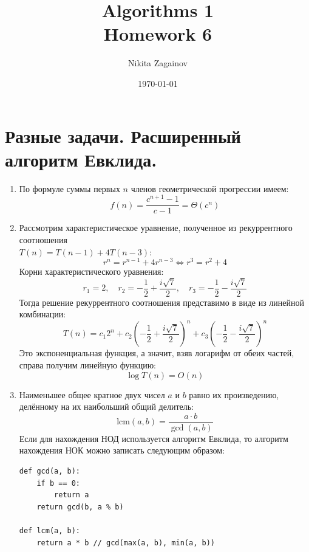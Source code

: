 \documentclass{article}
\title{Algorithms 1 \\ Homework 6}
\author{Nikita Zagainov}
\date{\today}
\begin{document}
\maketitle

\section{Разные задачи. Расширенный алгоритм Евклида.}
\begin{enumerate}
    \item
          По формуле суммы первых $n$ членов
          геометрической прогрессии имеем:
          \[
              f(n) = \frac{c^{n + 1} - 1}{c - 1} = \Theta(c^n)
          \]

    \item
          Рассмотрим характеристическое уравнение,
          полученное из рекуррентного соотношения \\
          $T(n) = T(n - 1) + 4T(n - 3)$:
          \[
              r^n = r^{n - 1} + 4r^{n - 3} \Longleftrightarrow
              r^3 = r^2 + 4
          \]
          Корни характеристического уравнения:
          \[
              r_1 = 2,
              \quad r_2 = -\frac{1}{2} + \frac{i\sqrt{7}}{2},
              \quad r_3 = -\frac{1}{2} - \frac{i\sqrt{7}}{2}
          \]
          Тогда решение рекуррентного соотношения представимо
          в виде из линейной комбинации:
          \[
              T(n) = c_1 2^n +
              c_2 \left(-\frac{1}{2} + \frac{i\sqrt{7}}{2}\right)^n +
              c_3 \left(-\frac{1}{2} - \frac{i\sqrt{7}}{2}\right)^n
          \]
          Это экспоненциальная функция, а значит,
          взяв логарифм от обеих частей, справа
          получим линейную функцию:
          \[
              \log T(n) = O(n)
          \]

    \item
          Наименьшее общее кратное двух чисел $a$ и $b$ равно
          их произведению, делённому на их наибольший общий делитель:
          \[
              \mathrm{lcm}(a, b) = \frac{a \cdot b}{\gcd(a, b)}
          \]
          Если для нахождения НОД используется алгоритм Евклида,
          то алгоритм нахождения НОК можно записать следующим образом:
          \begin{lstlisting}
def gcd(a, b):
    if b == 0:
        return a
    return gcd(b, a % b)

def lcm(a, b):
    return a * b // gcd(max(a, b), min(a, b))
          \end{lstlisting}


\end{enumerate}
\end{document}
